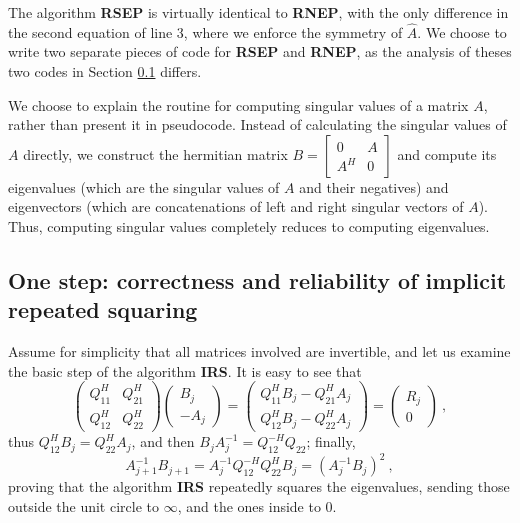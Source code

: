 \documentclass{article}
\theoremstyle{definition}
\begin{document}
\vspace{.35cm}

The algorithm \textbf{RSEP} is virtually identical to \textbf{RNEP}, with the only difference in the second equation of line 3, where we enforce the symmetry of $\hat{A}$. We choose to write two separate pieces of code for \textbf{RSEP} and \textbf{RNEP}, as the analysis of theses two codes in Section \ref{CRA} differs.

We choose to explain the routine for computing singular values of a matrix $A$,  rather than present it in pseudocode. Instead of calculating the singular values of $A$ directly, we construct the hermitian matrix $B = \left [\begin{array}{cc} 0 & A \\ A^{H} & 0 \end{array} \right]$ and compute its eigenvalues (which are the singular values of $A$ and their negatives) and eigenvectors (which are concatenations of left and right singular vectors of $A$). Thus, computing singular values completely reduces to computing eigenvalues. 

\subsection{One step: correctness and reliability of implicit repeated squaring} \label{CRA} 

Assume for simplicity that all matrices involved are invertible, and let us examine the basic step of the algorithm \textbf{IRS}. It is easy to see that
\[
\left ( \begin{array}{cc} Q_{11}^{H} & Q_{21}^{H} \\ Q_{12}^{H} & Q_{22}^{H} \end{array} \right ) \left( \begin{array}{c} B_j \\ - A_j \end{array} \right ) = \left ( \begin{array}{c} Q_{11}^{H} B_j - Q_{21}^{H} A_j \\ Q_{12}^{H} B_j - Q_{22}^{H} A_j \end{array} \right ) = \left ( \begin{array}{c} R_j \\ 0 \end{array} \right)~,
\]
thus $Q_{12}^{H} B_j = Q_{22}^{H} A_j$, and then $B_j A_j^{-1} = Q_{12}^{-H} Q_{22}$; finally, $$A_{j+1}^{-1} B_{j+1} = A_{j}^{-1} Q_{12}^{-H} Q_{22}^{H}B_j = (A_j^{-1} B_j )^2~,$$ proving that the algorithm \textbf{IRS} repeatedly squares the eigenvalues, sending those outside the unit circle to $\infty$, and the ones inside to $0$.
\end{document}
